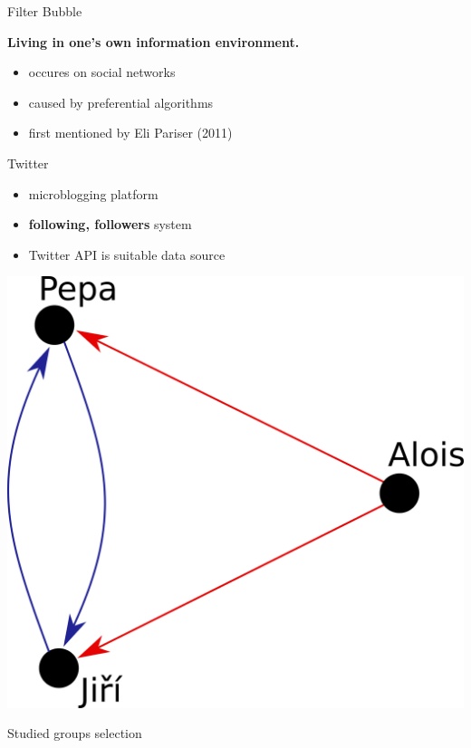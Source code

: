 \documentclass[landscape,a0paper,fontscale=0.285]{baposter} %
\begin{document}
\begin{poster}
\begin{columns}[T]
\begin{column}{.33\textwidth}
\begin{block}{Filter Bubble}
    \center
    \begin{large}\textbf{Living in one's own information environment.}\end{large}
    \vspace{0.8cm}
    \begin{itemize}
        \item occures on social networks
        \item caused by preferential algorithms
        \item first mentioned by Eli Pariser (2011)
    \end{itemize}
\end{block}
\begin{block}{Twitter}
	\begin{itemize}
		\item microblogging platform
        \item \textbf{following, followers} system
		\item Twitter API is suitable data source
	\end{itemize}
	\center
	\includegraphics[scale=0.55]{./Pics/pepa.png}
\end{block}
\begin{block}{Studied groups selection}

\end{block}
\end{column}
\end{columns}
\end{poster}
\end{document}
